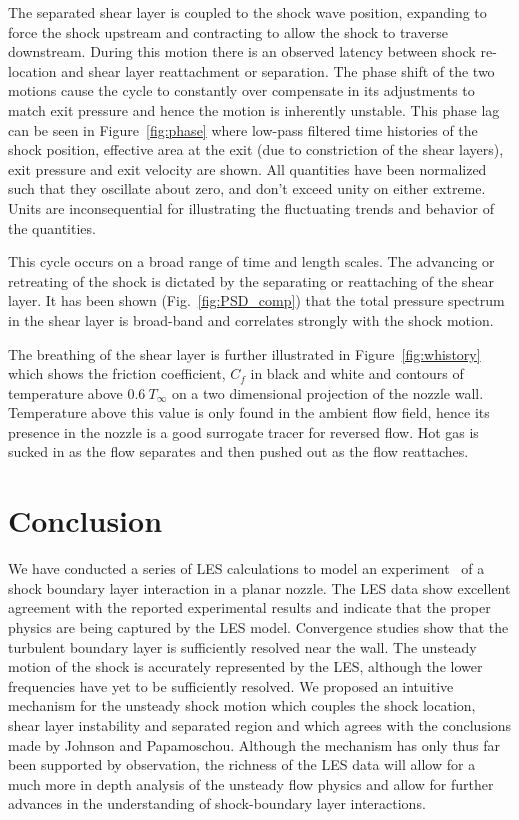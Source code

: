\documentclass[]{aiaa-tc}%
\begin{document}
The separated shear layer is coupled to the shock wave position, expanding to force the shock upstream and contracting to allow the shock to traverse downstream.  During this motion there is an observed latency between shock re-location and shear layer reattachment or separation.  The phase shift of the two motions cause the cycle to constantly over compensate in its adjustments to match exit pressure and hence the motion is inherently unstable.  This phase lag can be seen in Figure~\ref{fig:phase} where low-pass filtered time histories of the shock position, effective area at the exit (due to constriction of the shear layers), exit pressure and exit velocity are shown.  All quantities have been normalized such that they oscillate about zero, and don't exceed unity on either extreme.  Units are inconsequential for illustrating the fluctuating trends and behavior of the quantities.

This cycle occurs on a broad range of time and length scales.  The advancing or retreating of the shock is dictated by the separating or reattaching of the shear layer.  It has been shown (Fig.~\ref{fig:PSD_comp}) that the total pressure spectrum in the shear layer is broad-band and correlates strongly with the shock motion.

The breathing of the shear layer is further illustrated in Figure~\ref{fig:whistory} which shows the friction coefficient, $C_f$ in black and white and contours of temperature above $0.6 \ T_{\infty}$ on a two dimensional projection of the nozzle wall.  Temperature above this value is only found in the ambient flow field, hence its presence in the nozzle is a good surrogate tracer for reversed flow.  Hot gas is sucked in as the flow separates and then pushed out as the flow reattaches.




\section{Conclusion}
We have conducted a series of LES calculations to model an experiment~\cite{Papam:10} of a shock boundary layer interaction in a planar nozzle.  The LES data show excellent agreement with the reported experimental results and indicate that the proper physics are being captured by the LES model.  Convergence studies show that the turbulent boundary layer is sufficiently resolved near the wall.  The unsteady motion of the shock is accurately represented by the LES, although the lower frequencies have yet to be sufficiently resolved.  We proposed an intuitive mechanism for the unsteady shock motion which couples the shock location, shear layer instability and separated region and which agrees with the conclusions made by Johnson and Papamoschou.  Although the  mechanism has only thus far been supported by observation, the richness of the LES data will allow for a much more in depth analysis of the unsteady flow physics and allow for further advances in the understanding of shock-boundary layer interactions. 
\end{document}
